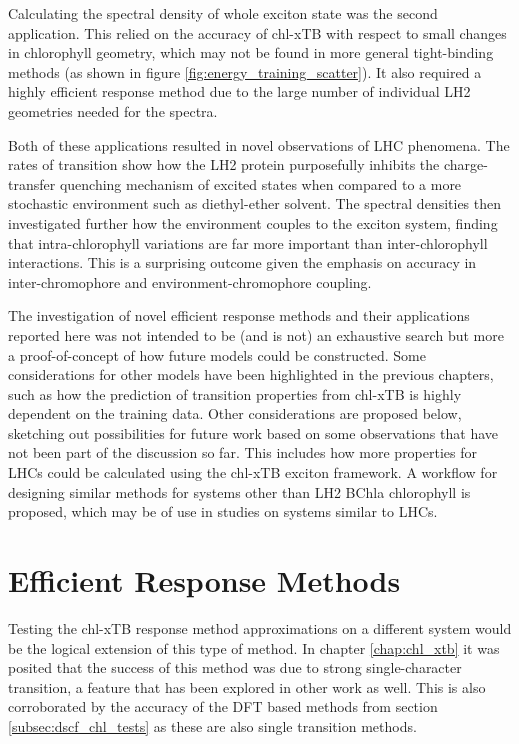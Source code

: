Calculating the spectral density of whole exciton state was the second application.
This relied on the accuracy of chl-xTB with respect to small changes in chlorophyll
geometry, which may not be found in more general tight-binding methods (as shown
in figure \ref{fig:energy_training_scatter}). It also required a highly efficient
response method due to the large number of individual LH2 geometries needed for 
the spectra.

Both of these applications resulted in novel observations of LHC phenomena. The
rates of transition show how the LH2 protein purposefully inhibits the charge-transfer
quenching mechanism of excited states when compared to a more stochastic environment
such as diethyl-ether solvent. The spectral densities then investigated further 
how the environment couples to the exciton system, finding that intra-chlorophyll
variations are far more important than inter-chlorophyll interactions. This is a
surprising outcome given the emphasis on accuracy in inter-chromophore and environment-chromophore
coupling.

The investigation of novel efficient response methods and their applications reported
here was not intended to be (and is not) an exhaustive search but more a proof-of-concept
of how future models could be constructed. Some considerations for other models 
have been highlighted in the previous chapters, such as how the prediction of transition
properties from chl-xTB is highly dependent on the training data. Other considerations
are proposed below, sketching out possibilities for future work based on some observations
that have not been part of the discussion so far. This includes how more properties 
for LHCs could be calculated using the chl-xTB exciton framework. A workflow for
designing similar methods for systems other than LH2 BChla chlorophyll is proposed,
which may be of use in studies on systems similar to LHCs.

\section{Efficient Response Methods}
\label{sec:future_response_methods}

Testing the chl-xTB response method approximations on a different system would be
the logical extension of this type of method. In chapter \ref{chap:chl_xtb} it was
posited that the success of this method was due to strong single-character transition,
a feature that has been explored in other work as well. This is also corroborated 
by the accuracy of the DFT based \dscf methods from section \ref{subsec:dscf_chl_tests}
as these are also single transition methods.

